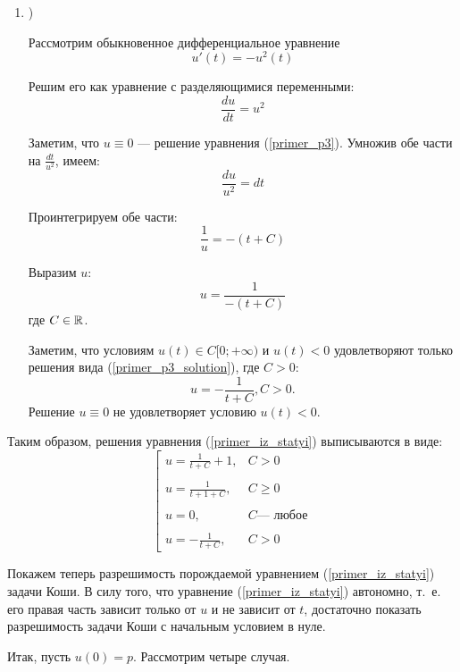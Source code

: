 \begin{enumerate}
\item)

Рассмотрим обыкновенное дифференциальное уравнение
\begin{equation}\label{primer_p3}
	u'(t)=-u^2(t)
\end{equation}

Решим его как уравнение с разделяющимися переменными:
$$
	\frac{du}{dt}=u^2
$$

Заметим, что $u\equiv 0$ --- решение уравнения (\ref{primer_p3}).
Умножив обе части на $\frac{dt}{u^2}$, имеем:
$$
	\frac{du}{u^2}=dt
$$

Проинтегрируем обе части:
$$
	\frac{1}{u}=-(t+C)
$$

Выразим $u$:
\begin{equation}\label{primer_p3_solution}
	u=\frac{1}{-(t+C)}
\end{equation}
где $C\in\mathbb{R}$.

Заметим, что условиям $u(t) \in C[0; +\infty)$ и $u(t) < 0$ удовлетворяют только решения вида (\ref{primer_p3_solution}), где $C>0$:
\begin{equation}
	u=-\frac{1}{t+C}, C>0.
\end{equation}
Решение $u \equiv 0$ не удовлетворяет условию $u(t)<0$.

\end{enumerate}

Таким образом, решения уравнения (\ref{primer_iz_statyi}) выписываются в виде:
\begin{equation}\label{primer_iz_statyi_u_t}
	\left[
		\begin{array}{ll}
			u=\frac{1}{t+C}+1, & C>0
		\\\\
			u=\frac{1}{t+1+C}, & C\geq0
		\\\\
			u=0,               & C \mbox{--- любое}
		\\\\
			u=-\frac{1}{t+C},  & C>0
		\end{array}
	\right.
\end{equation}

Покажем теперь разрешимость порождаемой уравнением (\ref{primer_iz_statyi}) задачи Коши.
В силу того, что уравнение (\ref{primer_iz_statyi}) автономно, т.~е. его правая часть зависит только от $u$ и не зависит от $t$,
достаточно показать разрешимость задачи Коши с начальным условием в нуле.

Итак, пусть $u(0) = p$.
Рассмотрим четыре случая.

